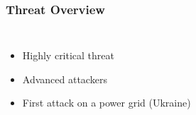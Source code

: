 \begin{frame}
\frametitle{Threat Overview}

\begin{columns}
\vspace{-15mm}
\begin{itemize}
    \item Highly critical threat
    \item Advanced attackers
    \item First attack on a power grid (Ukraine)
\end{itemize}

\begin{figure}[b]
\end{figure}
\end{columns}
\end{frame}
